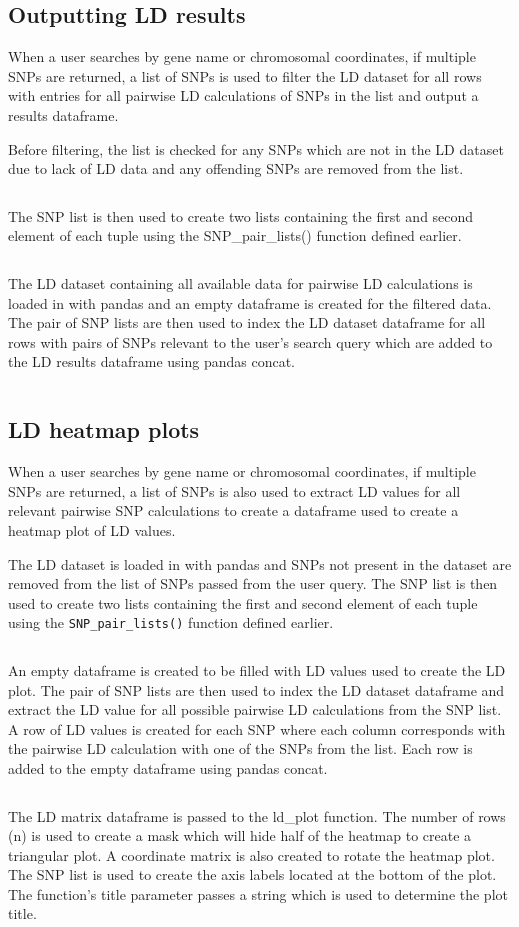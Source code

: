 \documentclass[12pt,a4paper]{article}
\newcommand{\mintfile}[1]{
\begin{tcolorbox}[colback=gray!5!white,%
	grow to left by=20mm,
    grow to right by=20mm,
    sharp corners]{{    \small \inputminted[breaklines]{python}{#1}		}}
\end{tcolorbox}}
\newcommand{\subsect}[1]{
\FloatBarrier %
\hypertarget{#1}{
\subsection{#1}\label{#1}}
}
\begin{document}
\subsect{Outputting LD results}
When a user searches by gene name or chromosomal coordinates, if multiple SNPs are returned, a list of SNPs is used to filter the LD dataset for all rows with entries for all pairwise LD calculations of SNPs in the list and output a results dataframe.


Before filtering, the list is checked for any SNPs which are not in the LD dataset due to lack of LD data and any offending SNPs are removed from the list.
\mintfile{code_snippets/placeholder.py}

The SNP list is then used to create two lists containing the first and second element of each tuple using the SNP\_pair\_lists() function defined earlier.
\mintfile{code_snippets/placeholder.py}


The LD dataset containing all available data for pairwise LD calculations is loaded in with pandas and an empty dataframe is created for the filtered data. The pair of SNP lists are then used to index the LD dataset dataframe for all rows with pairs of SNPs relevant to the user’s search query which are added to the LD results dataframe using pandas concat.
\mintfile{code_snippets/placeholder.py}

\subsect{LD heatmap plots}

When a user searches by gene name or chromosomal coordinates, if multiple SNPs are returned, a list of SNPs is also used to extract LD values for all relevant pairwise SNP calculations to create a dataframe used to create a heatmap plot of LD values.

The LD dataset is loaded in with pandas and SNPs not present in the dataset are removed from the list of SNPs passed from the user query. The SNP list is then used to create two lists containing the first and second element of each tuple using the \texttt{SNP\_pair\_lists()} function defined earlier.
\mintfile{code_snippets/placeholder.py}

An empty dataframe is created to be filled with LD values used to create the LD plot. The pair of SNP lists are then used to index the LD dataset dataframe and extract the LD value for all possible pairwise LD calculations from the SNP list. A row of LD values is created for each SNP where each column corresponds with the pairwise LD calculation with one of the SNPs from the list. Each row is added to the empty dataframe using pandas concat.
\mintfile{code_snippets/placeholder.py}

The LD matrix dataframe is passed to the ld\_plot function. The number of rows (n) is used to create a mask which will hide half of the heatmap to create a triangular plot. A coordinate matrix is also created to rotate the heatmap plot. The SNP list is used to create the axis labels located at the bottom of the plot. The function’s title parameter passes a string which is used to determine the plot title.
\mintfile{code_snippets/placeholder.py}
\end{document}
